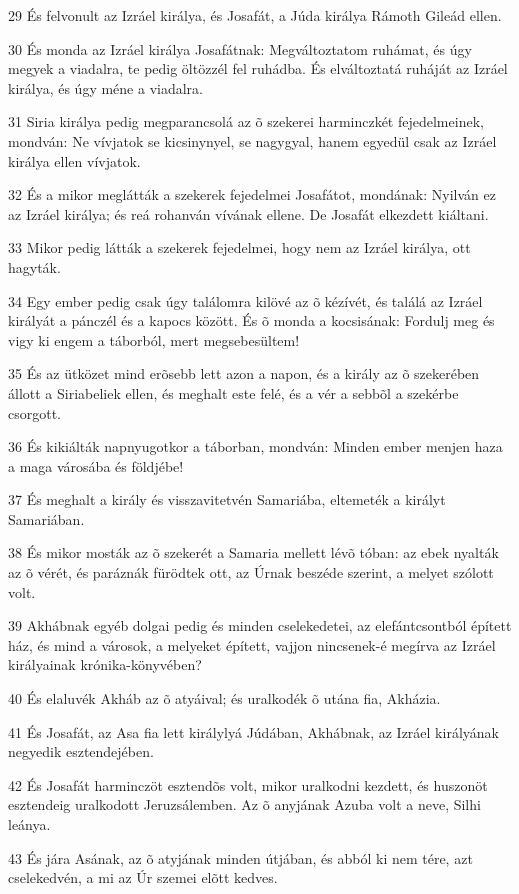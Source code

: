 \par 29 És felvonult az Izráel királya, és Josafát, a Júda királya Rámoth Gileád ellen.
\par 30 És monda az Izráel királya Josafátnak: Megváltoztatom ruhámat, és úgy megyek a viadalra, te pedig öltözzél fel ruhádba. És elváltoztatá ruháját az Izráel királya, és úgy méne a viadalra.
\par 31 Siria királya pedig megparancsolá az õ szekerei harminczkét fejedelmeinek, mondván: Ne vívjatok se kicsinynyel, se nagygyal, hanem egyedül csak az Izráel királya ellen vívjatok.
\par 32 És a mikor meglátták a szekerek fejedelmei Josafátot, mondának: Nyilván ez az Izráel királya; és reá rohanván vívának ellene. De Josafát elkezdett kiáltani.
\par 33 Mikor pedig látták a szekerek fejedelmei, hogy nem az Izráel királya, ott hagyták.
\par 34 Egy ember pedig csak úgy találomra kilövé az õ kézívét, és találá az Izráel királyát a pánczél és a kapocs között. És õ monda a kocsisának: Fordulj meg és vigy ki engem a táborból, mert megsebesültem!
\par 35 És az ütközet mind erõsebb lett azon a napon, és a király az õ szekerében állott a Siriabeliek ellen, és meghalt este felé, és a vér a sebbõl a szekérbe csorgott.
\par 36 És kikiálták napnyugotkor a táborban, mondván: Minden ember menjen haza a maga városába és földjébe!
\par 37 És meghalt a király és visszavitetvén Samariába, eltemeték a királyt Samariában.
\par 38 És mikor mosták az õ szekerét a Samaria mellett lévõ tóban: az ebek nyalták az õ vérét, és paráznák fürödtek ott, az Úrnak beszéde szerint, a melyet szólott volt.
\par 39 Akhábnak egyéb dolgai pedig és minden cselekedetei, az elefántcsontból épített ház, és mind a városok, a melyeket épített, vajjon nincsenek-é megírva az Izráel királyainak krónika-könyvében?
\par 40 És elaluvék Akháb az õ atyáival; és uralkodék õ utána fia, Akházia.
\par 41 És Josafát, az Asa fia lett királylyá Júdában, Akhábnak, az Izráel királyának negyedik esztendejében.
\par 42 És Josafát harminczöt esztendõs volt, mikor uralkodni kezdett, és huszonöt esztendeig uralkodott Jeruzsálemben. Az õ anyjának Azuba volt a neve, Silhi leánya.
\par 43 És jára Asának, az õ atyjának minden útjában, és abból ki nem tére, azt cselekedvén, a mi az Úr szemei elõtt kedves.
